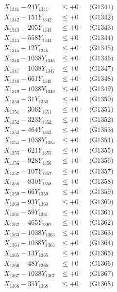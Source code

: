\documentclass[a4paper,10pt]{article}
\begin{document}
{\begin{align}
\allowbreak
X_{1341} - 24Y_{1341} &\leq +0 && \text{(G1341)} \\
X_{1342} - 151Y_{1342} &\leq +0 && \text{(G1342)} \\
X_{1343} - 205Y_{1343} &\leq +0 && \text{(G1343)} \\
X_{1344} - 558Y_{1344} &\leq +0 && \text{(G1344)} \\
X_{1345} - 12Y_{1345} &\leq +0 && \text{(G1345)} \\
X_{1346} - 1038Y_{1346} &\leq +0 && \text{(G1346)} \\
X_{1347} - 1038Y_{1347} &\leq +0 && \text{(G1347)} \\
X_{1348} - 661Y_{1348} &\leq +0 && \text{(G1348)} \\
X_{1349} - 1038Y_{1349} &\leq +0 && \text{(G1349)} \\
X_{1350} - 31Y_{1350} &\leq +0 && \text{(G1350)} \\
\allowbreak
X_{1351} - 306Y_{1351} &\leq +0 && \text{(G1351)} \\
X_{1352} - 323Y_{1352} &\leq +0 && \text{(G1352)} \\
X_{1353} - 464Y_{1353} &\leq +0 && \text{(G1353)} \\
X_{1354} - 1038Y_{1354} &\leq +0 && \text{(G1354)} \\
X_{1355} - 621Y_{1355} &\leq +0 && \text{(G1355)} \\
X_{1356} - 928Y_{1356} &\leq +0 && \text{(G1356)} \\
X_{1357} - 107Y_{1357} &\leq +0 && \text{(G1357)} \\
X_{1358} - 830Y_{1358} &\leq +0 && \text{(G1358)} \\
X_{1359} - 66Y_{1359} &\leq +0 && \text{(G1359)} \\
X_{1360} - 93Y_{1360} &\leq +0 && \text{(G1360)} \\
\allowbreak
X_{1361} - 59Y_{1361} &\leq +0 && \text{(G1361)} \\
X_{1362} - 465Y_{1362} &\leq +0 && \text{(G1362)} \\
X_{1363} - 1038Y_{1363} &\leq +0 && \text{(G1363)} \\
X_{1364} - 1038Y_{1364} &\leq +0 && \text{(G1364)} \\
X_{1365} - 13Y_{1365} &\leq +0 && \text{(G1365)} \\
X_{1366} - 48Y_{1366} &\leq +0 && \text{(G1366)} \\
X_{1367} - 1038Y_{1367} &\leq +0 && \text{(G1367)} \\
X_{1368} - 35Y_{1368} &\leq +0 && \text{(G1368)} \\

\end{align}}
\end{document}
